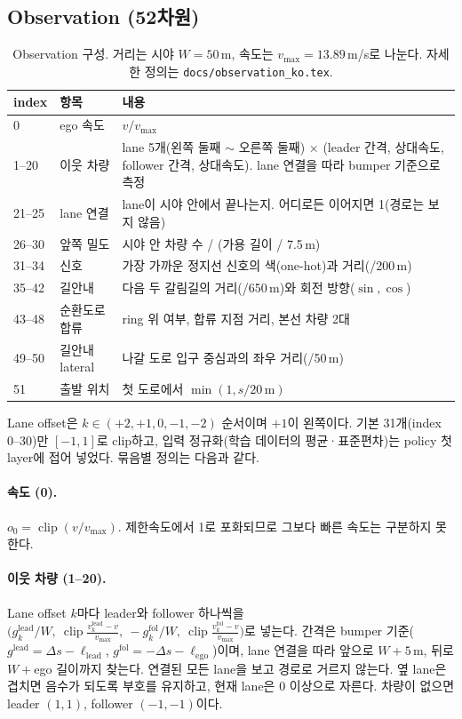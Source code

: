 \documentclass[10pt,a4paper]{article}
\newcommand{\vmax}{v_{\max}}
\begin{document}
\subsection{Observation (52차원)}\label{sec:obs}
\begin{table}[h]
\centering
\caption{Observation 구성. 거리는 시야 $W=50$\,m, 속도는 $\vmax=13.89$\,m/s로 나눈다. 자세한 정의는 \texttt{docs/observation\_ko.tex}.}
\label{tab:obs}
\small
\begin{tabularx}{\linewidth}{@{}llL@{}}
\toprule
index & 항목 & 내용 \\
 & ego 속도 & $v/\vmax$ \\
1--20 & 이웃 차량 & lane 5개(왼쪽 둘째 $\sim$ 오른쪽 둘째) $\times$ (leader 간격, 상대속도, follower 간격, 상대속도). lane 연결을 따라 bumper 기준으로 측정 \\
21--25 & lane 연결 & lane이 시야 안에서 끝나는지. 어디로든 이어지면 1(경로는 보지 않음) \\
26--30 & 앞쪽 밀도 & 시야 안 차량 수 / (가용 길이 / 7.5\,m) \\
31--34 & 신호 & 가장 가까운 정지선 신호의 색(one-hot)과 거리(/200\,m) \\
35--42 & 길안내 & 다음 두 갈림길의 거리(/650\,m)와 회전 방향($\sin, \cos$) \\
43--48 & 순환도로 합류 & ring 위 여부, 합류 지점 거리, 본선 차량 2대 \\
49--50 & 길안내 lateral & 나갈 도로 입구 중심과의 좌우 거리(/50\,m) \\
51 & 출발 위치 & 첫 도로에서 $\min(1, s/20\,\mathrm{m})$ \\
\bottomrule
\end{tabularx}
\end{table}
Lane offset은 $k \in (+2, +1, 0, -1, -2)$ 순서이며 $+1$이 왼쪽이다. 기본 31개(index 0--30)만 $[-1,1]$로 clip하고, 입력 정규화(학습 데이터의 평균·표준편차)는 policy 첫 layer에 접어 넣었다. 묶음별 정의는 다음과 같다.

\paragraph{속도 (0).} $o_0 = \operatorname{clip}(v/\vmax)$. 제한속도에서 1로 포화되므로 그보다 빠른 속도는 구분하지 못한다.

\paragraph{이웃 차량 (1--20).} Lane offset $k$마다 leader와 follower 하나씩을 $\big(g^{\mathrm{lead}}_k/W,\ \operatorname{clip}\tfrac{v^{\mathrm{lead}}_k-v}{\vmax},\ -g^{\mathrm{fol}}_k/W,\ \operatorname{clip}\tfrac{v^{\mathrm{fol}}_k-v}{\vmax}\big)$로 넣는다. 간격은 bumper 기준($g^{\mathrm{lead}} = \Delta s - \ell_{\mathrm{lead}}$, $g^{\mathrm{fol}} = -\Delta s - \ell_{\mathrm{ego}}$)이며, lane 연결을 따라 앞으로 $W+5$\,m, 뒤로 $W+{}$ego 길이까지 찾는다. 연결된 모든 lane을 보고 경로로 거르지 않는다. 옆 lane은 겹치면 음수가 되도록 부호를 유지하고, 현재 lane은 0 이상으로 자른다. 차량이 없으면 leader $(1,1)$, follower $(-1,-1)$이다.
\end{document}
